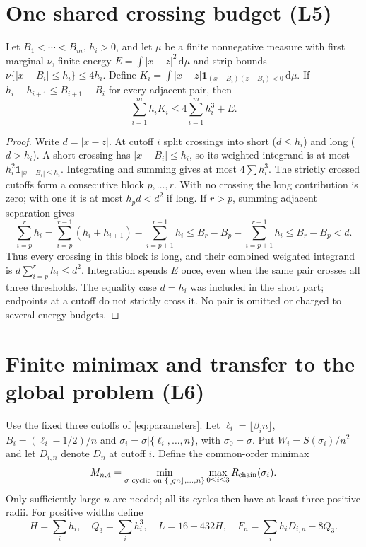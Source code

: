 \documentclass[review,supplement,hidelinks,onefignum,onetabnum]{siamart251216}
\newcommand{\Rc}{R_{\rm chain}}
\newcommand{\ind}{\mathbf 1}
\newcommand{\dd}{\,\mathrm d}
\begin{document}
\section{One shared crossing budget (L5)}\label{sec:crossings}
\begin{lemma}\label{lem:crossing}
Let $B_1<\cdots<B_m$, $h_i>0$, and let $\mu$ be a finite nonnegative
measure with first marginal $\nu$, finite energy
$E=\int|x-z|^2\dd\mu$ and strip bounds
$\nu\{|x-B_i|\le h_i\}\le4h_i$. Define
$K_i=\int|x-z|\ind_{(x-B_i)(z-B_i)<0}\dd\mu$.
If $h_i+h_{i+1}\le B_{i+1}-B_i$ for every adjacent pair, then
\begin{equation}\label{eq:shared}
\sum_{i=1}^m h_iK_i\le4\sum_{i=1}^m h_i^3+E.
\end{equation}
\end{lemma}
\begin{proof}
Write $d=|x-z|$. At cutoff $i$ split crossings into short ($d\le h_i$)
and long ($d>h_i$). A short crossing has $|x-B_i|\le h_i$, so its
weighted integrand is at most $h_i^2\ind_{|x-B_i|\le h_i}$. Integrating
and summing gives at most $4\sum h_i^3$.
The strictly crossed cutoffs form a consecutive block $p,\ldots,r$.
With no crossing the long contribution is zero; with one it is at most
$h_pd<d^2$ if long. If $r>p$, summing adjacent separation gives
\[
\sum_{i=p}^r h_i
=\sum_{i=p}^{r-1}(h_i+h_{i+1})-\sum_{i=p+1}^{r-1}h_i
\le B_r-B_p-\sum_{i=p+1}^{r-1}h_i\le B_r-B_p<d.
\]
Thus every crossing in this block is long, and their combined weighted
integrand is $d\sum_{i=p}^rh_i\le d^2$. Integration spends $E$ once,
even when the same pair crosses all three thresholds. The equality case
$d=h_i$ was included in the short part; endpoints at a cutoff do not
strictly cross it. No pair is omitted or charged to several energy budgets.
\end{proof}

\section{Finite minimax and transfer to the global problem (L6)}\label{sec:minimax}
Use the fixed three cutoffs of \eqref{eq:parameters}. Let
$\ell_i=\lfloor\beta_i n\rfloor$, $B_i=(\ell_i-1/2)/n$ and
$\sigma_i=\sigma|\{\ell_i,\ldots,n\}$, with $\sigma_0=\sigma$.
Put $W_i=S(\sigma_i)/n^2$ and let $D_{i,n}$ denote $D_n$ at cutoff $i$.
Define the common-order minimax
\[
M_{n,4}=\min_{\sigma\text{ cyclic on }\{\lfloor qn\rfloor,\ldots,n\}}
\max_{0\le i\le3}\Rc(\sigma_i).
\]
Only sufficiently large $n$ are needed; all its cycles then have at least
three positive radii. For positive widths define
\[
H=\sum_i h_i,\quad Q_3=\sum_i h_i^3,\quad L=16+432H,
\quad F_n=\sum_i h_iD_{i,n}-8Q_3.
\]
\end{document}
